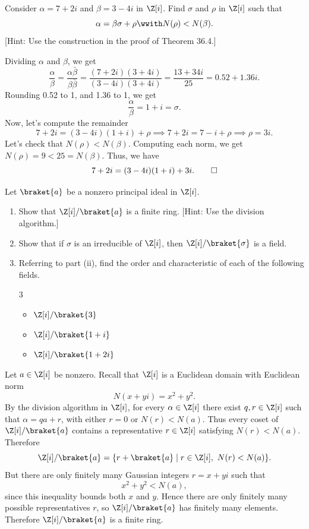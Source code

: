 \begin{problem}[36.6]
  Consider $\alpha = 7 + 2i$ and $\beta = 3 - 4i$ in $\Z[i]$. Find $\sigma$ and $\rho$ in $\Z[i]$ such that
  \[%
    \alpha = \beta\sigma + \rho \wwith N(\rho) < N(\beta)
  .\]%
  [Hint: Use the construction in the proof of Theorem 36.4.]
\end{problem}

\begin{solution}
  Dividing $\alpha$ and $\beta$, we get
  \[%
    \frac{\alpha}{\beta} = \frac{\alpha\bar{\beta}}{\beta\bar{\beta}} = \frac{(7 + 2i)(3 + 4i)}{(3 - 4i)(3 + 4i)} = \frac{13 + 34i}{25} = 0.52 + 1.36i
  .\]%
  Rounding 0.52 to 1, and 1.36 to 1, we get
  \[%
    \frac{\alpha}{\beta} = 1 + i = \sigma
  .\]%
  Now, let's compute the remainder
  \[%
    7 + 2i = (3 - 4i)(1 + i) + \rho \implies 7 + 2i = 7 - i + \rho \implies \rho = 3i
  .\]%
  Let's check that $N(\rho) < N(\beta)$. Computing each norm, we get $N(\rho) = 9 < 25 = N(\beta)$. Thus, we have
  \[%
    7 + 2i = (3 - 4i)(1 + i) + 3i
  .\qedhere\]%
\end{solution}

\begin{problem}[36.15]
  Let $\braket{a}$ be a nonzero principal ideal in $\Z[i]$.
  \begin{enumerate}
    \item Show that $\Z[i]/\braket{a}$ is a finite ring. [Hint: Use the division algorithm.]
    \item Show that if $\sigma$ is an irreducible of $\Z[i]$, then $\Z[i]/\braket{\sigma}$ is a field.
    \item Referring to part (ii), find the order and characteristic of each of the following fields.
      \begin{multicols}{3}
        \begin{itemize}
          \item[(a)] $\Z[i]/\braket{3}$
          \item[(b)] $\Z[i]/\braket{1+i}$
          \item[(c)] $\Z[i]/\braket{1+2i}$
        \end{itemize}
      \end{multicols}
  \end{enumerate}
\end{problem}

\begin{solution}[(i)]
  Let $a \in \Z[i]$ be nonzero. Recall that $\Z[i]$ is a Euclidean domain with Euclidean norm
  \[%
    N(x + yi) = x^2 + y^2
  .\]%
  By the division algorithm in $\Z[i]$, for every $\alpha \in \Z[i]$ there exist $q,r \in \Z[i]$ such that $\alpha = qa + r$, with either $r = 0$ or $N(r) < N(a)$. Thus every coset of $\Z[i]/\braket{a}$ contains a representative $r \in \Z[i]$ satisfying $N(r) < N(a)$. Therefore
  \[%
    \Z[i]/\braket{a} = \{r + \braket{a} \mid r \in \Z[i],\ N(r) < N(a)\}
  .\]%
  But there are only finitely many Gaussian integers $r = x+yi$ such that
  \[%
    x^2 + y^2 < N(a)
  ,\]%
  since this inequality bounds both $x$ and $y$. Hence there are only finitely many possible representatives $r$, so $\Z[i]/\braket{a}$ has finitely many elements. Therefore $\Z[i]/\braket{a}$ is a finite ring.
\end{solution}

